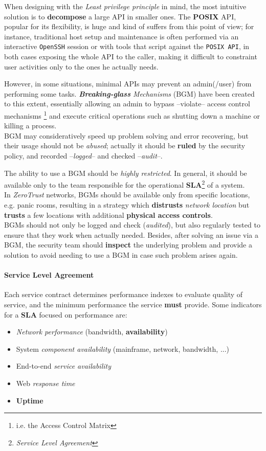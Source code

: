 When designing with the \textit{Least privilege principle} in mind,
the most intuitive solution is to \textbf{decompose} a large API in smaller ones.
The \textbf{POSIX} API, popular for its flexibility, is huge and kind of suffers from this point of view;
for instance, traditional host setup and maintenance is often performed via an interactive
\texttt{OpenSSH} session or with tools that script against the \texttt{POSIX API},
in both cases exposing the whole API to the caller,
making it difficult to constraint user activities only to the ones he actually needs.
\nl

However, in some situations, minimal APIs may prevent an admin(/user) from performing some tasks.
\textit{\textbf{Breaking-glass} Mechanisms} (BGM) have been created to this extent,
essentially allowing an admin to bypass {--}violate{--} access control
mechanisms \footnote{i.e. the Access Control Matrix} and execute critical
operations such as shutting down a machine or killing a process.\\
BGM may consideratively speed up problem solving and error recovering, but their usage should not be \textit{abused};
actually it should be \textbf{ruled} by the security policy,
and recorded {--}\textit{logged}{--} and checked {--}\textit{audit}{--}.

The ability to use a BGM should be \textit{highly restricted}. 
In general, it should be available only to the team responsible for the operational \textbf{SLA}\footnote{\textit{Service Level Agreement}} of a system.\\
In \textit{ZeroTrust} networks, BGMs should be available only from specific locations, e.g. panic rooms, 
resulting in a strategy which \textbf{distrusts} \textit{network location} but \textbf{trusts} a few locations
with additional \textbf{physical access controls}.\\
BGMs should not only be logged and check (\textit{audited}),
but also regularly tested to ensure that they work when actually needed.
Besides, after solving an issue via a BGM,
the security team should \textbf{inspect} the underlying problem and provide a solution to avoid needing to use a BGM in case such problem arises again.

\paragraph{Service Level Agreement}
Each service contract determines performance indexes to evaluate quality of service, and the minimum performance the service \textbf{must} provide.
Some indicators for a \textbf{SLA} focused on performance are:
\begin{itemize}
   \item \textit{Network performance} (bandwidth, \textbf{availability})
   \item System \textit{component availability} (mainframe, network, bandwidth, ...)
   \item End-to-end \textit{service availability}
   \item Web \textit{response time}
   \item \textbf{Uptime}
\end{itemize}

